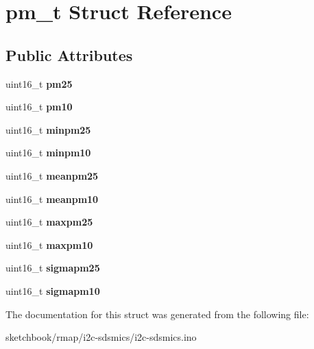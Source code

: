 \hypertarget{structpm__t}{}\section{pm\+\_\+t Struct Reference}
\label{structpm__t}
\subsection*{Public Attributes}
\begin{DoxyCompactItemize}
\item 
\mbox{\label{structpm__t_adc2e8fb1c7459a9da5b0d2fb9a6526f0}} 
uint16\+\_\+t {\bfseries pm25}
\item 
\mbox{\label{structpm__t_a2b126458a5a8246732d2789149141e14}} 
uint16\+\_\+t {\bfseries pm10}
\item 
\mbox{\label{structpm__t_a09fd38cae0fef89abbd282838e575419}} 
uint16\+\_\+t {\bfseries minpm25}
\item 
\mbox{\label{structpm__t_a328d3f4b77f711badaf769461a456363}} 
uint16\+\_\+t {\bfseries minpm10}
\item 
\mbox{\label{structpm__t_af9e45d111be15c0019f824cae15a3c7a}} 
uint16\+\_\+t {\bfseries meanpm25}
\item 
\mbox{\label{structpm__t_a76bf4a8166c3c5b28e8887495f7624cb}} 
uint16\+\_\+t {\bfseries meanpm10}
\item 
\mbox{\label{structpm__t_a8ebdfcaf9e890ac07d527c3073d7afb4}} 
uint16\+\_\+t {\bfseries maxpm25}
\item 
\mbox{\label{structpm__t_a90a43cdec2a18549b709dba4e20d7fd9}} 
uint16\+\_\+t {\bfseries maxpm10}
\item 
\mbox{\label{structpm__t_a4f39734ab6d6ee3c22168134bdcb812e}} 
uint16\+\_\+t {\bfseries sigmapm25}
\item 
\mbox{\label{structpm__t_a763a2760ddbc7bad8e5efe01bac025af}} 
uint16\+\_\+t {\bfseries sigmapm10}
\end{DoxyCompactItemize}


The documentation for this struct was generated from the following file\+:\begin{DoxyCompactItemize}
\item 
sketchbook/rmap/i2c-\/sdsmics/i2c-\/sdsmics.\+ino\end{DoxyCompactItemize}
